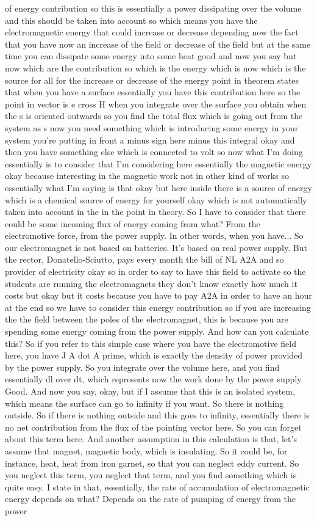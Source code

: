 of energy contribution so this is essentially a power dissipating over the volume and this should be taken into account so which means you have the electromagnetic energy that could increase or decrease depending now the fact that you have now an increase of the field or decrease of the field but at the same time you can dissipate some energy into some heat good and now you say but now which are the contribution so which is the energy which is now which is the source for all for the increase or decrease of the energy point in theorem states that when you have a surface essentially you have this contribution here so the point in vector is e cross H when you integrate over the surface you obtain when the s is oriented outwards so you find the total flux which is going out from the system as s now you need something which is introducing some energy in your system you're putting in front a minus sign here minus this integral okay and then you have something else which is connected to volt so now what I'm doing essentially is to consider that I'm considering here essentially the magnetic energy okay because interesting in the magnetic work not in other kind of works so essentially what I'm saying is that okay but here inside there is a source of energy which is a chemical source of energy for yourself okay which is not automatically taken into account in the in the point in theory. So I have to consider that there could be some incoming flux of energy coming from what? From the electromotive force, from the power supply. In other words, when you have... So our electromagnet is not based on batteries. It's based on real power supply. But the rector, Donatello-Sciutto, pays every month the bill of NL A2A and so provider of electricity okay so in order to say to have this field to activate so the students are running the electromagnets they don't know exactly how much it costs but okay but it costs because you have to pay A2A in order to have an hour at the end so we have to consider this energy contribution so if you are increasing the the field between the poles of the electromagnet, this is because you are spending some energy coming from the power supply. And how can you calculate this? So if you refer to this simple case where you have the electromotive field here, you have J A dot A prime, which is exactly the density of power provided by the power supply. So you integrate over the volume here, and you find essentially dl over dt, which represents now the work done by the power supply. Good. And now you say, okay, but if I assume that this is an isolated system, which means the surface can go to infinity if you want. So there is nothing outside. So if there is nothing outside and this goes to infinity, essentially there is no net contribution from the flux of the pointing vector here. So you can forget about this term here. And another assumption in this calculation is that, let's assume that magnet, magnetic body, which is insulating. So it could be, for instance, heat, heat from iron garnet, so that you can neglect eddy current. So you neglect this term, you neglect that term, and you find something which is quite easy. I state in that, essentially, the rate of accumulation of electromagnetic energy depends on what? Depends on the rate of pumping of energy from the power 
